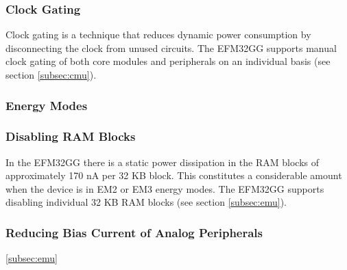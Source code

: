 \subsubsection{Clock Gating}
Clock gating is a technique that reduces dynamic power consumption by disconnecting the clock from unused circuits. The EFM32GG supports manual clock gating of both core modules and peripherals on an individual basis (see section \ref{subsec:cmu}).\cite{efm32-energy-optimization} 

\subsubsection{Energy Modes}

\subsubsection{Disabling RAM Blocks}
In the EFM32GG there is a static power dissipation in the RAM blocks of approximately 170 nA per 32 KB block. This constitutes a considerable amount when the device is in EM2 or EM3 energy modes. The EFM32GG supports disabling individual 32 KB RAM blocks (see section \ref{subsec:emu}).\cite{efm32-energy-optimization}

\subsubsection{Reducing Bias Current of Analog Peripherals}



\ref{subsec:emu}

